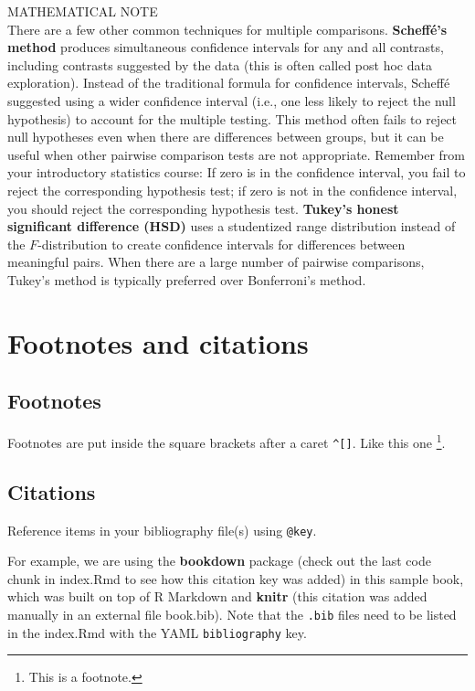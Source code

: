 \documentclass[
]{report}
\begin{document}
MATHEMATICAL NOTE\\
There are a few other common techniques for multiple comparisons. \textbf{Scheffé's method} produces simultaneous confidence intervals for any and all contrasts, including contrasts suggested by the data (this is often called post hoc data exploration). Instead of the traditional formula for confidence intervals, Scheffé suggested using a wider confidence interval (i.e., one less likely to reject the null hypothesis) to account for the multiple testing. This method often fails to reject null hypotheses even when there are differences between groups, but it can be useful when other pairwise comparison tests are not appropriate. Remember from your introductory statistics course: If zero is in the confidence interval, you fail to reject the corresponding hypothesis test; if zero is not in the confidence interval, you should reject the corresponding hypothesis test. \textbf{Tukey's honest significant difference (HSD)} uses a studentized range distribution instead of the \(F\)-distribution to create confidence intervals for differences between meaningful pairs. When there are a large number of pairwise comparisons, Tukey's method is typically preferred over Bonferroni's method.

\chapter{Footnotes and citations}\label{footnotes-and-citations}

\section{Footnotes}\label{footnotes}

Footnotes are put inside the square brackets after a caret \texttt{\^{}{[}{]}}. Like this one \footnote{This is a footnote.}.

\section{Citations}\label{citations}

Reference items in your bibliography file(s) using \texttt{@key}.

For example, we are using the \textbf{bookdown} package \citep{R-bookdown} (check out the last code chunk in index.Rmd to see how this citation key was added) in this sample book, which was built on top of R Markdown and \textbf{knitr} \citep{xie2015} (this citation was added manually in an external file book.bib).
Note that the \texttt{.bib} files need to be listed in the index.Rmd with the YAML \texttt{bibliography} key.
\end{document}
